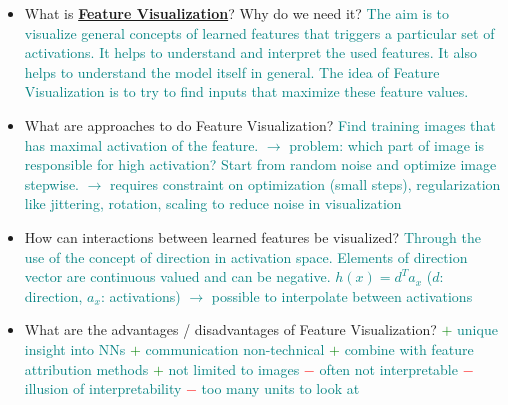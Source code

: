 \documentclass{report}
\newcommand{\asw}[2][teal]{}
\renewcommand{\asw}[2][teal]{\textcolor{#1}{#2}}
\begin{document}
\begin{itemize}
		\item What is \textbf{\underline{Feature Visualization}}? Why do we need it?
		\asw{\newline The aim is to visualize general concepts of learned features that triggers a particular set of activations.
			\newline It helps to understand and interpret the used features. It also helps to understand the model itself in general.
			\newline The idea of Feature Visualization is to try to find inputs that maximize these feature values.}
		\item What are approaches to do Feature Visualization?
		\asw{\newline Find training images that has maximal activation of the feature.
			\newline $\rightarrow$ problem: which part of image is responsible for high activation?
			\newline Start from random noise and optimize image stepwise.
			\newline $\rightarrow$ requires constraint on optimization (small steps), regularization like jittering, rotation, scaling to reduce noise in visualization}
		\item How can interactions between learned features be visualized?
		\asw{\newline Through the use of the concept of direction in activation space. Elements of direction vector are continuous valued and can be negative.
			\newline $h(x) = d^T a_x$ ($d$: direction, $a_x$: activations)
			\newline $\rightarrow$ possible to interpolate between activations}
		\item What are the advantages / disadvantages of Feature Visualization?
		\asw{\newline \textcolor{green}{$+$} unique insight into NNs
			\newline \textcolor{green}{$+$} communication non-technical
			\newline \textcolor{green}{$+$} combine with feature attribution methods
			\newline \textcolor{green}{$+$} not limited to images
			\newline \textcolor{red}{$-$} often not interpretable
			\newline \textcolor{red}{$-$} illusion of interpretability
			\newline \textcolor{red}{$-$} too many units to look at}
		

\end{itemize}
\end{document}
